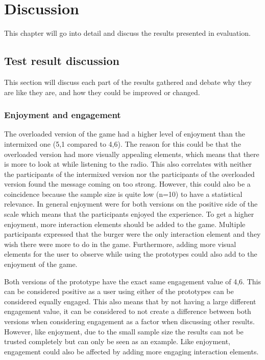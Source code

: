 \chapter{Discussion}
This chapter will go into detail and discuss the results presented in evaluation. 

\section{Test result discussion}
This section will discuss each part of the results gathered and debate why they are like they are, and how they could be improved or changed.

     \subsection{Enjoyment and engagement}
     The overloaded version of the game had a higher level of enjoyment than the intermixed one (5,1 compared to 4,6). The reason for this could be that the overloaded version had more visually appealing elements, which means that there is more to look at while listening to the radio. This also correlates with neither the participants of the intermixed version nor the participants of the overloaded version found the message coming on too strong. However, this could also be a coincidence because the sample size is quite low (n=10) to have a statistical relevance. In general enjoyment were for both versions on the positive side of the scale which means that the participants enjoyed the experience. To get a higher enjoyment, more interaction elements should be added to the game. Multiple participants expressed that the burger were the only interaction element and they wish there were more to do in the game. Furthermore, adding more visual elements for the user to observe while using the prototypes could also add to the enjoyment of the game.
     
     Both versions of the prototype have the exact same engagement value of 4,6. This can be considered positive as a user using either of the prototypes can be considered equally engaged. This also means that by not having a large different engagement value, it can be considered to not create a difference between both versions when considering engagement as a factor when discussing other results. However, like enjoyment, due to the small sample size the results can not be trusted completely but can only be seen as an example. Like enjoyment, engagement could also be affected by adding more engaging interaction elements.
     
